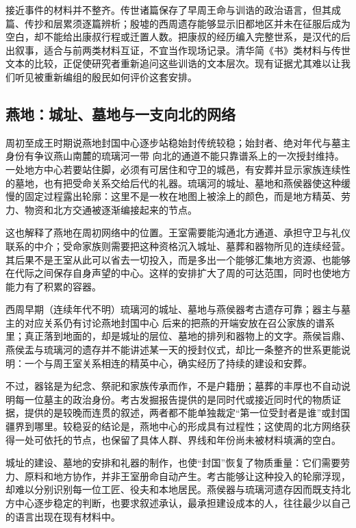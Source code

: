 \begin{sourcenote}
接近事件的材料并不整齐。传世诸篇保存了早周王命与训诰的政治语言，但其成篇、传抄和层累须逐篇辨析；殷墟的西周遗存能够显示旧都地区并未在征服后成为空白，却不能给出康叔行程或迁置人数。把康叔的经历编入完整世系，是汉代的后出叙事，适合与前两类材料互证，不宜当作现场记录。清华简《书》类材料与传世文本的比较，正促使研究者重新追问这些训诰的文本层次。现有证据尤其难以让我们听见被重新编组的殷民如何评价这套安排。
\end{sourcenote}

\subsection{燕地：城址、墓地与一支向北的网络}

\begin{event}{周初至成王时期说}{燕地封国中心逐步站稳}{始封传统较稳；始封者、绝对年代与墓主身份有争议}{燕山南麓的琉璃河一带}
向北的通道不能只靠谱系上的一次授封维持。一处地方中心若要站住脚，必须有可居住和守卫的城邑，有安葬并显示家族连续性的墓地，也有把受命关系交给后代的礼器。琉璃河的城址、墓地和燕侯器使这种缓慢的固定过程露出轮廓：这里不是一枚在地图上被涂上的颜色，而是地方精英、劳力、物资和北方交通被逐渐编接起来的节点。

这也解释了燕地在周初网络中的位置。王室需要能沟通北方通道、承担守卫与礼仪联系的中介；受命家族则需要把这种资格沉入城址、墓葬和器物所见的连续经营。其后果不是王室从此可以省去一切投入，而是多出一个能够汇集地方资源、也能够在代际之间保存自身声望的中心。这样的安排扩大了周的可达范围，同时也使地方能力有了积累的容器。
\end{event}

\begin{event}{西周早期（连续年代不明）}{琉璃河的城址、墓地与燕侯器}{考古遗存可靠；器主与墓主的对应关系仍有讨论}{燕地封国中心}
后来的把燕的开端安放在召公家族的谱系里；真正落到地面的，却是城址的层位、墓地的排列和器物上的文字。燕侯旨鼎、燕侯盂与琉璃河的遗存并不能讲述某一天的授封仪式，却比一条整齐的世系更能说明：一个与周王室关系相连的精英中心，确实经历了持续的建设和安葬。

不过，器铭是为纪念、祭祀和家族传承而作，不是户籍册；墓葬的丰厚也不自动说明每一位墓主的政治身份。考古发掘报告提供的是同时代或接近同时代的物质证据，提供的是较晚而连贯的叙述，两者都不能单独裁定“第一位受封者是谁”或封国疆界到哪里。较稳妥的结论是，燕地中心的形成具有过程性；这使周的北方网络获得一处可依托的节点，也保留了具体人群、界线和年份尚未被材料填满的空白。
\end{event}

城址的建设、墓地的安排和礼器的制作，也使“封国”恢复了物质重量：它们需要劳力、原料和地方协作，并非王室册命自动产生。考古能够让这种投入的轮廓浮现，却难以分别识别每一位工匠、役夫和本地居民。燕侯器与琉璃河遗存因而既支持北方中心逐步稳定的判断，也要求叙述承认，最承担建设成本的人，往往最少以自己的语言出现在现有材料中。
